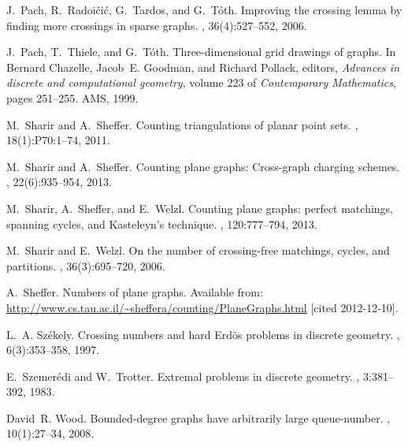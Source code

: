 \documentclass[12pt]{article}
\begin{document}
\begin{thebibliography}{10}
J.~Pach, R.~Radoi\v{c}i{\'c}, G.~Tardos, and G.~T{\'o}th.
\newblock Improving the crossing lemma by finding more crossings in sparse
  graphs.
, 36(4):527--552, 2006.

J.~Pach, T.~Thiele, and G.~T\'{o}th.
\newblock Three-dimensional grid drawings of graphs.
\newblock In Bernard Chazelle, Jacob~E. Goodman, and Richard Pollack, editors,
  {\em Advances in discrete and computational geometry}, volume 223 of {\em
  Contemporary Mathematics}, pages 251--255. AMS, 1999.

M.~Sharir and A.~Sheffer.
\newblock Counting triangulations of planar point sets.
, 18(1):P70:1--74, 2011.

M.~Sharir and A.~Sheffer.
\newblock Counting plane graphs: Cross-graph charging schemes.
, 22(6):935--954, 2013.

M.~Sharir, A.~Sheffer, and E.~Welzl.
\newblock Counting plane graphs: perfect matchings, spanning cycles, and
  {K}asteleyn's technique.
, 120:777--794, 2013.

M.~Sharir and E.~Welzl.
\newblock On the number of crossing-free matchings, cycles, and partitions.
, 36(3):695--720, 2006.

A.~Sheffer.
\newblock Numbers of plane graphs.
\newblock Available from:
  \url{http://www.cs.tau.ac.il/~sheffera/counting/PlaneGraphs.html} [cited
  2012-12-10].

L.~A. Sz{\'e}kely.
\newblock Crossing numbers and hard {E}rd{\"o}s problems in discrete geometry.
, 6(3):353--358, 1997.

E.~Szemer{\'e}di and W.~Trotter.
\newblock Extremal problems in discrete geometry.
, 3:381--392, 1983.

David~R. Wood.
\newblock Bounded-degree graphs have arbitrarily large queue-number.
,
  10(1):27--34, 2008.

\end{thebibliography}
\end{document}
